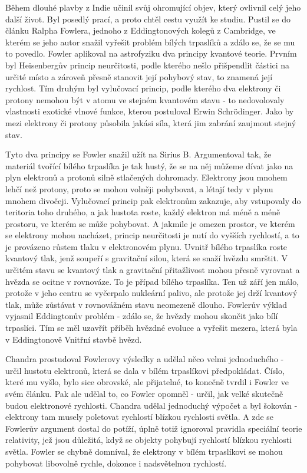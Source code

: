   Během dlouhé plavby z Indie učinil svůj ohromující objev, který ovlivnil celý jeho další život.
  Byl posedlý prací, a proto chtěl cestu využít ke studiu. Pustil se do článku Ralpha Fowlera,
  jednoho z Eddingtonových kolegů z Cambridge, ve kterém se jeho autor snažil vyřešit problém bílých
  trpaslíků a zdálo se, že se mu to povedlo. Fowler aplikoval na astrofyziku dva principy kvantové
  teorie. Prvním byl Heisenbergův princip neurčitosti, podle kterého nešlo přišpendlit částici na
  určité místo a zároveň přesně stanovit její pohybový stav, to znamená její rychlost. Tím druhým
  byl vylučovací princip, podle kterého dva elektrony či protony nemohou být v atomu ve stejném
  kvantovém stavu - to nedovolovaly vlastnosti exotické vlnové funkce, kterou postuloval Erwin
  Schrödinger. Jako by mezi elektrony či protony působila jakási síla, která jim zabrání zaujmout
  stejný stav. 
  
  Tyto dva principy se Fowler snažil užít na Sirius B. Argumentoval tak, že materiál tvořící bílého
  trpaslíka je tak hustý, že se na něj můžeme dívat jako na plyn elektronů a protonů silně
  stlačených dohromady. Elektrony jsou mnohem lehčí než protony, proto se mohou volněji pohybovat, a
  létají tedy v plynu mnohem divočeji. Vylučovací princip pak elektronům zakazuje, aby vstupovaly do
  teritoria toho druhého, a jak hustota roste, každý elektron má méně a méně prostoru, ve kterém se
  může pohybovat. A jakmile je omezen prostor, ve kterém se elektrony mohou nacházet, princip
  neurčitosti je nutí do vyšších rychlostí, a to je provázeno růstem tlaku v elektronovém plynu.
  Uvnitř bílého trpaslíka roste kvantový tlak, jenž soupeří s gravitační silou, která se snaží
  hvězdu smrštit. V určitém stavu se kvantový tlak a gravitační přitažlivost mohou přesně vyrovnat a
  hvězda se ocitne v rovnováze. To je případ bílého trpaslíka. Ten už září jen málo, protože v jeho
  centru se vyčerpalo nukleární palivo, ale protože jej drží kvantový tlak, může zůstávat v
  rovnovážném stavu neomezeně dlouho. Fowlerův výklad vyjasnil Eddingtonův problém - zdálo se, že
  hvězdy mohou skončit jako bílí trpaslíci. Tím se měl uzavřít příběh hvězdné evoluce a vyřešit
  mezera, která byla v Eddingtonově Vnitřní stavbě hvězd.
  
  Chandra prostudoval Fowlerovy výsledky a udělal něco velmi jednoduchého - určil hustotu elektronů,
  která se dala v bílém trpaslíkovi předpokládat. Číslo, které mu vyšlo, bylo sice obrovské, ale
  přijatelné, to konečně tvrdil i Fowler ve svém článku. Pak ale udělal to, co Fowler opomněl -
  určil, jak velké skutečně budou elektronové rychlosti. Chandra udělal jednoduchý výpočet a byl
  šokován - elektrony tam musely poletovat rychlostí blízkou rychlosti světla. A zde se Fowlerův
  argument dostal do potíží, úplně totiž ignoroval pravidla speciální teorie relativity, jež jsou
  důležitá, když se objekty pohybují rychlostí blízkou rychlosti světla. Fowler se chybně domníval,
  že elektrony v bílém trpaslíkovi se mohou pohybovat libovolně rychle, dokonce i nadsvětelnou
  rychlostí. 
  
